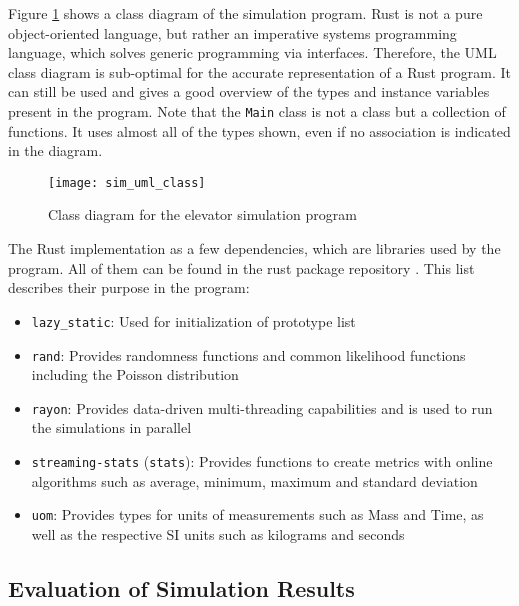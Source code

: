 Figure \ref{fig:impl:simclass} shows a class diagram of the simulation program.
Rust is not a pure object-oriented language, but rather an imperative systems programming language, which solves generic programming via interfaces.
Therefore, the \ac{UML} class diagram is sub-optimal for the accurate representation of a Rust program.
It can still be used and gives a good overview of the types and instance variables present in the program.
Note that the \texttt{Main} class is not a class but a collection of functions.
It uses almost all of the types shown, even if no association is indicated in the diagram.

\begin{figure}[p]
    \centering
    \texttt{[image: sim\_uml\_class]}
    \caption{Class diagram for the elevator simulation program}
    \label{fig:impl:simclass}
\end{figure}

The Rust implementation as a few dependencies, which are libraries used by the program.
All of them can be found in the rust package repository \autocite[][]{rust2018cratesio}.
This list describes their purpose in the program:
\begin{samepage}
\begin{itemize}[noitemsep]
    \item \texttt{lazy\_static}: Used for initialization of prototype list
    \item \texttt{rand}: Provides randomness functions and common likelihood functions including the Poisson distribution
    \item \texttt{rayon}: Provides data-driven multi-threading capabilities and is used to run the simulations in parallel
    \item \texttt{streaming-stats} (\texttt{stats}): Provides functions to create metrics with online algorithms such as average,  minimum, maximum and standard deviation
    \item \texttt{uom}: Provides types for units of measurements such as Mass and Time, as well as the respective \ac{SI} units such as kilograms and seconds
\end{itemize}
\end{samepage}

\subsection{Evaluation of Simulation Results}


